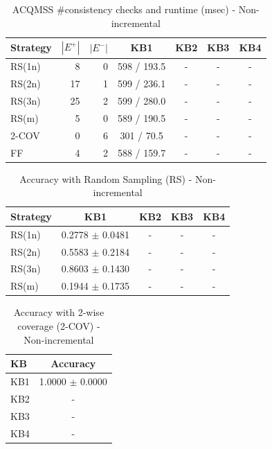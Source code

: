 \begin{table}[htbp]
\centering
\caption{ACQMSS \#consistency checks and runtime (msec) - Non-incremental}
\label{tab:table7_non-incremental}
\begin{tabular}{lrrcccc}
\toprule
Strategy & $|E^+|$ & $|E^-|$ & KB1 & KB2 & KB3 & KB4 \\
\midrule
RS(1n) & 8 & 0 & 598 / 193.5 & - & - & - \\
RS(2n) & 17 & 1 & 599 / 236.1 & - & - & - \\
RS(3n) & 25 & 2 & 599 / 280.0 & - & - & - \\
RS(m) & 5 & 0 & 589 / 190.5 & - & - & - \\
2-COV & 0 & 6 & 301 / 70.5 & - & - & - \\
FF & 4 & 2 & 588 / 159.7 & - & - & - \\
\bottomrule
\end{tabular}
\end{table}

\begin{table}[htbp]
\centering
\caption{Accuracy with Random Sampling (RS) - Non-incremental}
\label{tab:table9_non-incremental}
\begin{tabular}{lcccc}
\toprule
Strategy & KB1 & KB2 & KB3 & KB4 \\
\midrule
RS(1n) & 0.2778 $\pm$ 0.0481 & - & - & - \\
RS(2n) & 0.5583 $\pm$ 0.2184 & - & - & - \\
RS(3n) & 0.8603 $\pm$ 0.1430 & - & - & - \\
RS(m) & 0.1944 $\pm$ 0.1735 & - & - & - \\
\bottomrule
\end{tabular}
\end{table}

\begin{table}[htbp]
\centering
\caption{Accuracy with 2-wise coverage (2-COV) - Non-incremental}
\label{tab:table10_non-incremental}
\begin{tabular}{lc}
\toprule
KB & Accuracy \\
\midrule
KB1 & 1.0000 $\pm$ 0.0000 \\
KB2 & - \\
KB3 & - \\
KB4 & - \\
\bottomrule
\end{tabular}
\end{table}

